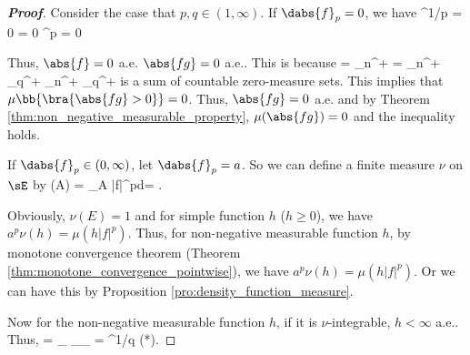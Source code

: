 \begin{proof}[\bf Proof]
Consider the case that $p,q \in (1,\infty)$. If $\dabs{f}_p = 0$, we have
\be
{}^{1/p} = 0 \quad\ra\quad {} = 0 \quad\ra\quad {}^p = 0 \ 
\ee

Thus, $\abs{f}= 0$ a.e. $\abs{fg} = 0$ a.e.. This is because
\be
{} = \bigcup_{n\in \Z^+}  = \bigcup_{n\in \Z^+} \bigcup_{q\in \R^+} \cap {} \subseteq \bigcup_{n\in \Z^+} \bigcup_{q\in \R^+} 
\ee
is a sum of countable zero-measure sets. This implies that $\mu\bb{\bra{\abs{fg} > 0}} = 0$. Thus, $\abs{fg} = 0$ a.e. and by Theorem \ref{thm:non_negative_measurable_property}, $\mu(\abs{fg}) = 0$ and the inequality holds.


If $\dabs{f}_p \in (0,\infty)$, let $\dabs{f}_p = a$. So we can define a finite measure $\nu$ on $\sE$ by
\be
\nu(A) = \int_A |f|^pd\mu =  \mu {}.
\ee

Obviously, $\nu(E)=1$ and for simple function $h$ ($h\geq 0$), we have $a^p\nu(h) = \mu(h|f|^p)$. Thus, for non-negative measurable function $h$, by monotone convergence theorem (Theorem \ref{thm:monotone_convergence_pointwise}), we have $a^p\nu(h) = \mu(h|f|^p)$. Or we can have this by Proposition \ref{pro:density_function_measure}.

Now for the non-negative measurable function $h$, if it is $\nu$-integrable, $h<\infty$ a.e.. %
Thus,
\beast
\nu {} = _{} \leq {}_{}\leq {}_{} = \nu{}^{1/q} \qquad (*).
\eeast


\end{proof}
